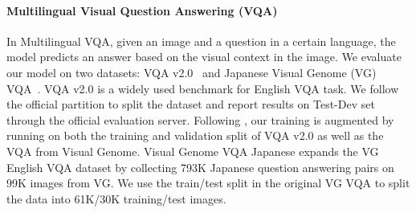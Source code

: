 \documentclass[final]{cvpr}
\newcommand{\linjie}[1]{\textcolor{asparagus}{\small{\bf [Linjie: #1 ]}}}
\begin{document}
\paragraph{Multilingual Visual Question Answering (VQA)}
In Multilingual VQA, given an image and a question in a certain language, the model predicts an answer based on the visual context in the image. We evaluate our model on two datasets: VQA v2.0~\cite{vqa_v2} and Japanese Visual Genome (VG) VQA~\cite{vqa_ja}. VQA v2.0 is a widely used benchmark for English VQA task. We follow the official partition to split the dataset and report results on Test-Dev set through the official evaluation server. Following \cite{UNITER}, our training is augmented by running on both the training and validation split of VQA v2.0 as well as the VQA from Visual Genome\cite{vg}. 
Visual Genome VQA Japanese \cite{vqa_ja} expands the VG English VQA dataset \cite{vg} by collecting 793K Japanese question answering pairs on 99K images from VG. We use the train/test split in the original VG VQA to split the data into 61K/30K training/test images. 
\end{document}
